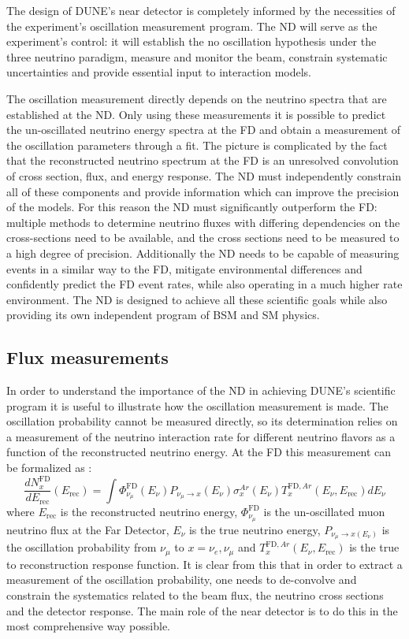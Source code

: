 The design of DUNE's near detector is completely informed by the necessities of the experiment's oscillation measurement program. The ND will serve as the experiment's control: it will establish the no oscillation hypothesis under the three neutrino paradigm, measure and monitor the beam, constrain systematic uncertainties and provide essential input to interaction models.

The oscillation measurement directly depends on the neutrino spectra that are established at the ND. Only using these measurements it is possible to predict the un-oscillated neutrino energy spectra at the FD and obtain a measurement of the oscillation parameters through a fit. The picture is complicated by the fact that the reconstructed neutrino spectrum at the FD is an unresolved convolution of cross section, flux, and energy response. The ND must independently constrain all of these components and provide information which can improve the precision of the models. For this reason the ND must significantly outperform the FD: multiple methods to determine neutrino fluxes with differing dependencies on the cross-sections need to be available, and the cross sections need to be measured to a high degree of precision. Additionally the ND needs to be capable of measuring events in a similar way to the FD,  mitigate environmental differences and confidently predict the FD event rates, while also operating in a much higher rate environment. The ND is designed to achieve all these scientific goals while also providing its own independent program of BSM and SM physics.

\subsection{Flux measurements}
\label{Sec:Flux}

In order to understand the importance of the ND in achieving DUNE's scientific program it is useful to illustrate how the oscillation measurement is made. The oscillation probability cannot be measured directly, so its determination relies on a measurement of the neutrino interaction rate for different neutrino flavors as a function of the reconstructed neutrino energy. At the FD this measurement can be formalized as \cite{DUNE:2020TDR1}:
\begin{equation}
    \frac{dN_x^\text{FD}}{dE_\text{rec}}(E_\text{rec})=\int\Phi^\text{FD}_{\nu_\mu}(E_\nu)P_{\nu_\mu \rightarrow x}(E_\nu)\sigma_x^{Ar}(E_\nu)T_x^{\text{FD},Ar} (E_\nu,E_\text{rec}) dE_\nu
\end{equation}
where $E_\text{rec}$ is the reconstructed neutrino energy, $\Phi^\text{FD}_{\nu_\mu}$ is the un-oscillated muon neutrino flux at the Far Detector, $E_\nu$ is the true neutrino energy, $P_{\nu_\mu \rightarrow x(E_\nu)}$ is the oscillation probability from $\nu_\mu$ to $x=\nu_e,\nu_\mu$ and $T_x^{\text{FD},Ar} (E_\nu,E_\text{rec})$ is the true to reconstruction response function. It is clear from this that in order to extract a measurement of the oscillation probability, one needs to de-convolve and constrain the systematics related to the beam flux, the neutrino cross sections and the detector response. The main role of the near detector is to do this in the most comprehensive way possible. 

